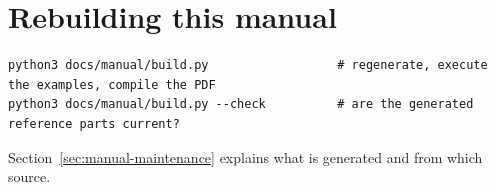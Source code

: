 \section{Rebuilding this manual}
\begin{lstlisting}
python3 docs/manual/build.py                  # regenerate, execute the examples, compile the PDF
python3 docs/manual/build.py --check          # are the generated reference parts current?
\end{lstlisting}
Section~\ref{sec:manual-maintenance} explains what is generated and from which source.
